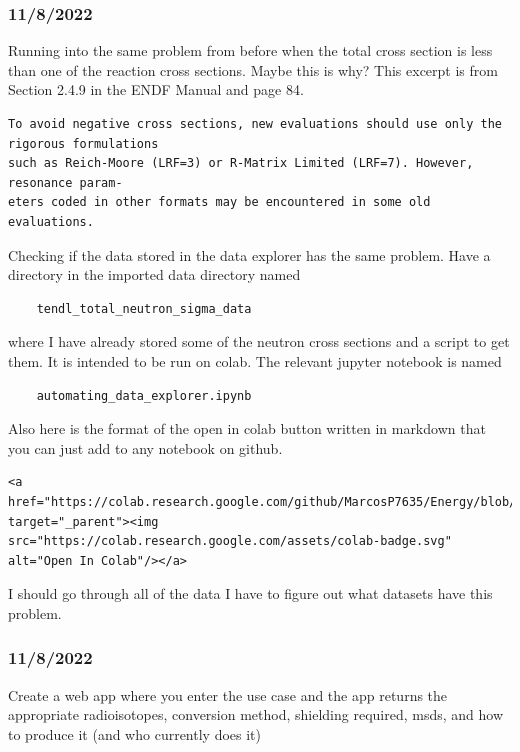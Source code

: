 \documentclass[12pt]{article}
\begin{document}
\subsubsection{11/8/2022}
Running into the same problem from before when the total cross section is less than one of the reaction cross sections. Maybe this is why? This excerpt is from Section 2.4.9 in the ENDF Manual and page 84. 
\begin{lstlisting}[breaklines]
To avoid negative cross sections, new evaluations should use only the rigorous formulations
such as Reich-Moore (LRF=3) or R-Matrix Limited (LRF=7). However, resonance param-
eters coded in other formats may be encountered in some old evaluations.
\end{lstlisting}
Checking if the data stored in the data explorer has the same problem. 
Have a directory in the imported data directory named \begin{verbatim}
    tendl_total_neutron_sigma_data
\end{verbatim}
where I have already stored some of the neutron cross sections and a script to get them. It is intended to be run on colab. The relevant jupyter notebook is named \begin{verbatim}
    automating_data_explorer.ipynb
\end{verbatim}
Also here is the format of the open in colab button written in markdown that you can just add to any notebook on github. 
\begin{lstlisting}[breaklines]
<a href="https://colab.research.google.com/github/MarcosP7635/Energy/blob/main/JupyterNotebooks/automating_data_explorer.ipynb" target="_parent"><img src="https://colab.research.google.com/assets/colab-badge.svg" alt="Open In Colab"/></a>
\end{lstlisting}
I should go through all of the data I have to figure out what datasets have this problem. 
\subsubsection{11/8/2022}
Create a web app where you enter the use case and the app returns the appropriate radioisotopes, conversion method, shielding required, msds, and how to produce it (and who currently does it)
\end{document}
